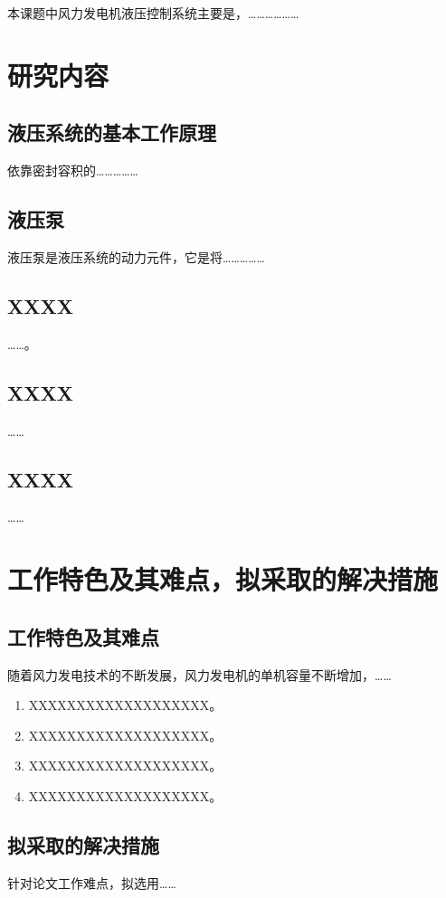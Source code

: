 \documentclass{sdjuproposal}
\begin{document}
本课题中风力发电机液压控制系统主要是，………………

\section{研究内容}

\subsection{液压系统的基本工作原理}
依靠密封容积的……………

\subsection{液压泵}
液压泵是液压系统的动力元件，它是将……………

\subsection{XXXX}
……。

\subsection{XXXX}
……

\subsection{XXXX}
……

\section{工作特色及其难点，拟采取的解决措施}

\subsection{工作特色及其难点}
随着风力发电技术的不断发展，风力发电机的单机容量不断增加，……
\begin{enumerate}
  \item XXXXXXXXXXXXXXXXXXX。
  \item XXXXXXXXXXXXXXXXXXX。
  \item XXXXXXXXXXXXXXXXXXX。
  \item XXXXXXXXXXXXXXXXXXX。
\end{enumerate}

\subsection{拟采取的解决措施}
针对论文工作难点，拟选用……
\end{document}
